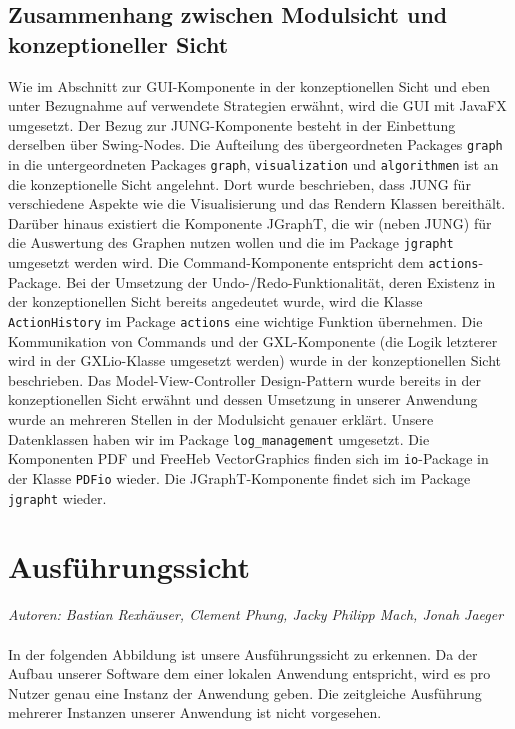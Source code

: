 \documentclass[enabledeprecatedfontcommands,fontsize=11pt,paper=a4,twoside]{scrartcl}
\newcounter{one}
\begin{document}
\subsection{Zusammenhang zwischen Modulsicht und konzeptioneller Sicht} Wie im Abschnitt zur GUI-Komponente  in der konzeptionellen Sicht und eben unter Bezugnahme auf verwendete Strategien erwähnt, wird die GUI mit JavaFX umgesetzt. Der Bezug zur JUNG-Komponente besteht in der Einbettung derselben über Swing-Nodes. Die Aufteilung des übergeordneten Packages \texttt{graph} in die untergeordneten Packages \texttt{graph}, \texttt{visualization} und \texttt{algorithmen} ist an die konzeptionelle Sicht angelehnt. Dort wurde beschrieben, dass JUNG für verschiedene Aspekte wie die Visualisierung und das Rendern Klassen bereithält. Darüber hinaus existiert die Komponente JGraphT, die wir (neben JUNG) für die Auswertung des Graphen nutzen wollen und die im Package \texttt{jgrapht} umgesetzt werden wird. Die Command-Komponente entspricht dem \texttt{actions}-Package. Bei der Umsetzung der Undo-/Redo-Funktionalität, deren Existenz in der konzeptionellen Sicht bereits angedeutet wurde, wird die Klasse \texttt{ActionHistory} im Package \texttt{actions} eine wichtige Funktion übernehmen. Die Kommunikation von Commands und der GXL-Komponente (die Logik letzterer wird in der GXLio-Klasse umgesetzt werden) wurde in der konzeptionellen Sicht beschrieben. Das Model-View-Controller Design-Pattern wurde bereits in der konzeptionellen Sicht erwähnt und dessen Umsetzung in unserer Anwendung wurde an mehreren Stellen in der Modulsicht genauer erklärt. Unsere Datenklassen haben wir im Package \texttt{log\_management} umgesetzt. Die Komponenten PDF und FreeHeb VectorGraphics finden sich im \texttt{io}-Package in der Klasse \texttt{PDFio} wieder. Die JGraphT-Komponente findet sich im Package \texttt{jgrapht} wieder.



\newpage
\section{Ausführungssicht}
\label{sec:ausfuehrung}
\emph{Autoren: Bastian Rexhäuser, Clement Phung, Jacky Philipp Mach, Jonah Jaeger}\\ \\

In der folgenden Abbildung ist unsere Ausführungssicht zu erkennen. Da der Aufbau unserer Software dem einer lokalen Anwendung entspricht, wird es pro Nutzer genau eine Instanz der Anwendung geben. Die zeitgleiche Ausführung mehrerer Instanzen unserer Anwendung ist nicht vorgesehen. \\
\end{document}
